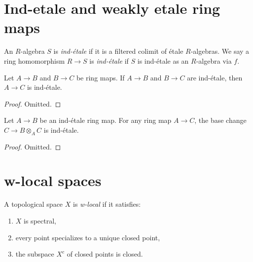 \section{Ind-etale and weakly etale ring maps}

\begin{definition}
    An $R$-algebra $S$ is \emph{ind-étale} if it is a filtered colimit of étale $R$-algebras.
    We say a ring homomorphism $R \to S$ is \emph{ind-étale} if $S$ is ind-étale as an $R$-algebra via $f$.
    \label{def:ind-etale}
\end{definition}

\begin{lemma}
  \label{thm:ind-etale-comp}
  Let $A \to B$ and $B \to C$ be ring maps. If $A \to B$ and $B \to C$ are ind-étale, then $A \to C$ is ind-étale.
\end{lemma}

\begin{proof}
  Omitted.
\end{proof}

\begin{lemma}
  \label{thm:ind-etale-base-change}
  Let $A \to B$ be an ind-étale ring map. For any ring map $A \to C$, the base change $C \to B \otimes_A C$ is ind-étale.
\end{lemma}

\begin{proof}
  Omitted.
\end{proof}

\section{w-local spaces}

\begin{definition}
    \label{def:w-local-space}
    \leanok
    A topological space \(X\) is \emph{w-local} if it satisfies:
    \begin{enumerate}
        \item \(X\) is spectral,
        \item every point specializes to a unique closed point,
        \item the subspace \(X^c\) of closed points is closed.
    \end{enumerate}
\end{definition}

